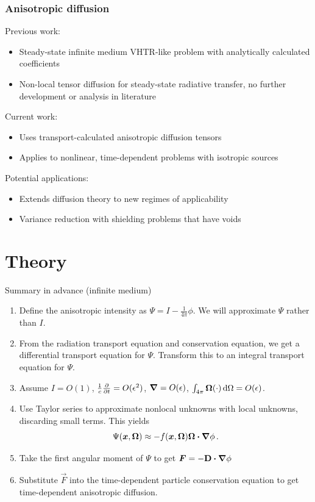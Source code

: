 \documentclass{beamer}
\begin{document}
\begin{frame}
  \frametitle{Anisotropic diffusion}
  Previous work:
  \begin{itemize}
    \item Steady-state infinite medium VHTR-like problem with analytically
      calculated coefficients \cite{Lar2009c}
    \item Non-local tensor diffusion \cite{Mor2007} for steady-state
      radiative transfer, no further development or analysis in literature
  \end{itemize}
  Current work:
  \begin{itemize}
    \item Uses transport-calculated anisotropic diffusion tensors
    \item Applies to nonlinear, time-dependent problems with isotropic sources
  \end{itemize}
  Potential applications:
  \begin{itemize}
    \item Extends diffusion theory to new regimes of applicability
    \item Variance reduction with shielding problems that have voids
  \end{itemize}
\end{frame}

\section{Theory}
\begin{frame}{Summary in advance (infinite medium)}
\begin{enumerate}
  \item Define the anisotropic intensity as $\Psi = I - \frac{1}{4\pi}\phi$.
    We will approximate $\Psi$ rather than $I$.
  \item From the radiation transport equation and conservation equation, we get
    a differential transport equation for $\Psi$. Transform this to an integral
    transport equation for $\Psi$.
  \item Assume $I=O(1)$, $\frac1c\frac{\partial }{\partial t}=O(\epsilon^2)$, $\bm{\nabla} =
    O(\epsilon)$, $\int_{4\pi} \bm{\Omega} (\cdot) \mathop{}\!\mathrm{d}\Omega = O(\epsilon)$.
  \item Use Taylor series to approximate nonlocal unknowns with local
    unknowns, discarding small terms. This yields
    \begin{equation*}
      \Psi(\bm{x}, \bm{\Omega})
      \approx - f(\bm{x}, \bm{\Omega})  \bm{\Omega} \bm{\cdot} \bm{\nabla} \phi\,.
    \end{equation*}
  \item Take the first angular moment of $\Psi$ to get $\bm{F}=-\mathbf{D} \bm{\cdot}
    \bm{\nabla} \phi$
  \item Substitute $\vec{F}$ into the time-dependent particle
    conservation equation to get time-dependent anisotropic diffusion.
\end{enumerate}
\end{frame}
\end{document}
